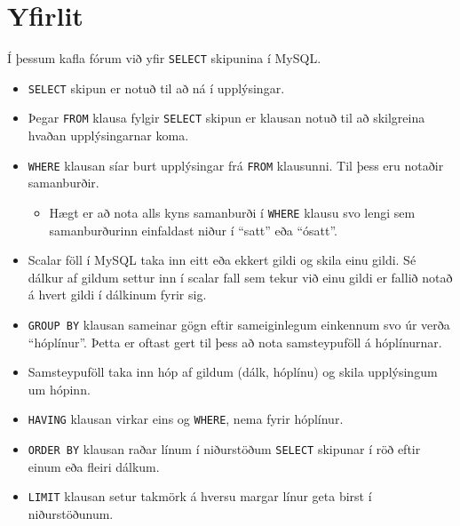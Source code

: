 \section{Yfirlit}
Í þessum kafla fórum við yfir \verb|SELECT| skipunina í MySQL.
\begin{itemize}
 \item \verb|SELECT| skipun er notuð til að ná í upplýsingar.
 \item Þegar \verb|FROM| klausa fylgir \verb|SELECT| skipun er klausan notuð til að skilgreina hvaðan upplýsingarnar koma. 
 \item \verb|WHERE| klausan síar burt upplýsingar frá \verb|FROM| klausunni. Til þess eru notaðir samanburðir.
 \begin{itemize}
  \item Hægt er að nota alls kyns samanburði í \verb|WHERE| klausu svo lengi sem samanburðurinn einfaldast niður í ``satt'' eða ``ósatt''.
 \end{itemize}
 \item Scalar föll í MySQL taka inn eitt eða ekkert gildi og skila einu gildi. Sé dálkur af gildum settur inn í scalar fall sem tekur við einu gildi er fallið notað á hvert gildi í dálkinum fyrir sig.
 \item \verb|GROUP BY| klausan sameinar gögn eftir sameiginlegum einkennum svo úr verða ``hóplínur''. Þetta er oftast gert til þess að nota samsteypuföll á hóplínurnar.
 \item Samsteypuföll taka inn hóp af gildum (dálk, hóplínu) og skila upplýsingum um hópinn.
 \item \verb|HAVING| klausan virkar eins og \verb|WHERE|, nema fyrir hóplínur.
 \item \verb|ORDER BY| klausan raðar línum í niðurstöðum \verb|SELECT| skipunar í röð eftir einum eða fleiri dálkum.
 \item \verb|LIMIT| klausan setur takmörk á hversu margar línur geta birst í niðurstöðunum.
\end{itemize}
